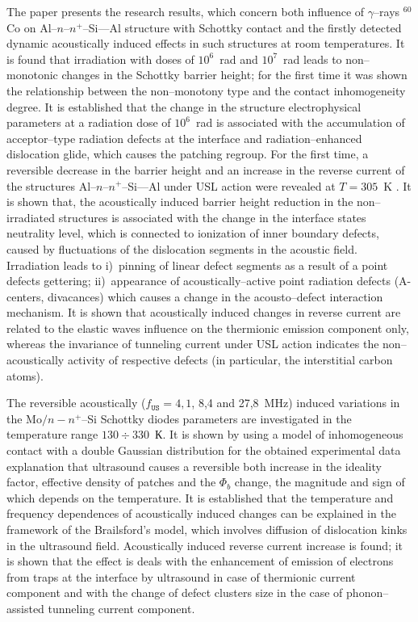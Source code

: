 The paper presents the research results, which concern both influence of $\gamma$--rays $^{60}$Co on Al--$n$--$n^+$--Si---Al structure with Schottky contact and
the firstly detected dynamic acoustically induced effects in such structures at room temperatures.
It is found that irradiation with doses of $10^6$~rad and $10^7$~rad leads to
non--monotonic changes in the Schottky barrier height;
for the first time it was shown the relationship between the non--monotony type and the contact inhomogeneity degree.
It is established that the change in the structure electrophysical parameters  at a radiation dose of $10^6$~rad
 is associated with the accumulation of acceptor--type radiation defects at the interface and
 radiation--enhanced dislocation glide, which causes the patching regroup.
For the first time, a reversible decrease in the barrier height and an increase in the reverse current of the structures Al--$n$--$n^+$--Si---Al under USL action were revealed at $T=305$~K .
It is shown that, the acoustically induced barrier height reduction in the non--irradiated structures is associated with the change in the interface states neutrality level, which is connected to ionization of inner boundary defects, caused by fluctuations of the dislocation segments in the acoustic field.
Irradiation leads to
i)~pinning of linear defect segments as a result of a point defects gettering;
ii)~appearance of acoustically--active point radiation defects (A-centers, divacances)
which causes a change in the acousto--defect interaction mechanism.
It is shown that acoustically induced changes in reverse current are related to the elastic waves influence on the thermionic emission component only,
whereas the invariance of tunneling current under USL action indicates the  non--acoustically activity of respective
defects (in particular, the interstitial carbon atoms).


The reversible acoustically ($f_\mathtt{US}=4,1$, 8,4 and 27,8~MHz)
induced variations in the Mo$/n-n^+$--Si Schottky diodes parameters are investigated in the temperature range $130\div330$~К.
It is shown by using a model of inhomogeneous contact with a double Gaussian distribution for the obtained experimental data explanation that ultrasound causes a reversible both increase in the ideality factor,  effective density of patches and the $\Phi_{b}$ change,
the magnitude and sign of which depends on the temperature.
It is established that the temperature and frequency dependences of acoustically induced changes can be explained in the framework of the Brailsford’s model,
which involves diffusion of dislocation kinks in the ultrasound field.
Acoustically induced reverse current increase is found;
it is shown that the effect is deals with the enhancement of emission of electrons from traps at the interface by ultrasound in case of thermionic current component
and with the change of defect clusters size in the case of phonon--assisted tunneling current component.


